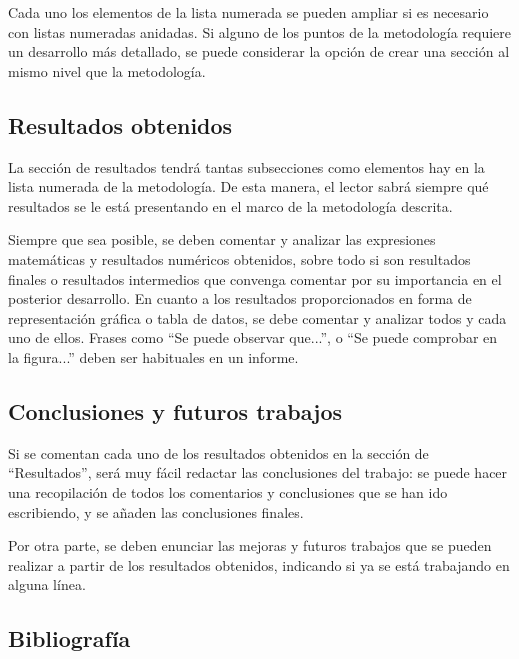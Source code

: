 \documentclass[11pt]{article}
\begin{document}
Cada uno los elementos de la lista numerada se pueden ampliar si es necesario con listas numeradas anidadas. Si alguno de los puntos de la metodología requiere un desarrollo más detallado, se puede considerar la opción de crear una sección al mismo nivel que la metodología.

\subsection{Resultados obtenidos}

La sección de resultados tendrá tantas subsecciones como elementos hay en la lista numerada de la metodología. De esta manera, el lector sabrá siempre qué resultados se le está presentando en el marco de la metodología descrita.

Siempre que sea posible, se deben comentar y analizar las expresiones matemáticas y resultados numéricos obtenidos, sobre todo si son resultados finales o resultados intermedios que convenga comentar por su importancia en el posterior desarrollo. En cuanto a los resultados proporcionados en forma de representación gráfica o tabla de datos, se debe comentar y analizar todos y cada uno de ellos. Frases como ``Se puede observar que...'', o ``Se puede comprobar en la figura...'' deben ser habituales en un informe.

\subsection{Conclusiones y futuros trabajos}

Si se comentan cada uno de los resultados obtenidos en la sección de ``Resultados'', será muy fácil redactar las conclusiones del trabajo: se puede hacer una recopilación de todos los comentarios y conclusiones que se han ido escribiendo, y se añaden las conclusiones finales.

Por otra parte, se deben enunciar las mejoras y futuros trabajos que se pueden realizar a partir de los resultados obtenidos, indicando si ya se está trabajando en alguna línea.

\subsection{Bibliografía}
\label{sec:estructura:bibliografia}
\end{document}
